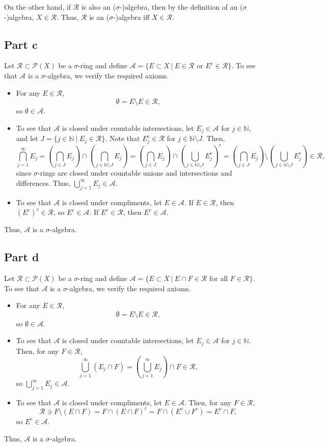\documentclass{article}
\begin{document}
On the other hand, if $\mathcal R$ is also an ($\sigma$-)algebra, then by the definition of an ($\sigma$-)algebra, $X\in\mathcal R$. Thus, $\mathcal{R}$ is an ($\sigma$-)algebra iff $X\in\mathcal R$.

\subsection{Part c}
Let $\mathcal R\subset\mathcal P(X)$ be a $\sigma$-ring and define $\mathcal A=\{E\subset X~|~E\in\mathcal R\text{ or }E^c\in\mathcal R\}$. To see that $\mathcal A$ is a $\sigma$-algebra, we verify the required axioms.
\begin{itemize}
	\item For any $E\in\mathcal R$, 
	\[
	\emptyset=E\setminus E\in\mathcal R,
	\]
	so $\emptyset\in\mathcal A$.
	\item To see that $\mathcal A$ is closed under countable intersections, let $E_j\in\mathcal{A}$ for $j\in\mathbb{N}$, and let $J=\{j\in\mathbb{N}~|~E_j\in\mathcal R\}$. Note that $E_j^c\in\mathcal R$ for $j\in \mathbb{N}\setminus J$. Then,
	\[
	\bigcap_{j=1}^\infty E_j=\left(\bigcap_{j\in J} E_j\right)\cap\left(\bigcap_{j\in \mathbb{N}\setminus J} E_j\right)=\left(\bigcap_{j\in J} E_j\right)\cap\left(\bigcup_{j\in \mathbb{N}\setminus J} E_j^c\right)^c=\left(\bigcap_{j\in J} E_j\right)\setminus\left(\bigcup_{j\in \mathbb{N}\setminus J} E_j^c\right)\in\mathcal R,
	\]
	since $\sigma$-rings are closed under countable unions and intersections and differences. Thus, $\bigcup_{j=1}^\infty E_j\in\mathcal A$.
	\item To see that $\mathcal A$ is closed under compliments, let $E\in\mathcal A$. If $E\in\mathcal R$, then $(E^c)^c\in\mathcal R$, so $E^c\in\mathcal A$. If $E^c\in\mathcal R$, then $E^c\in\mathcal A$.
\end{itemize}
Thus, $\mathcal A$ is a $\sigma$-algebra.
\subsection{Part d}
Let $\mathcal R\subset\mathcal P(X)$ be a $\sigma$-ring and define $\mathcal A=\{E\subset X~|~E\cap F\in\mathcal R\text{ for all }F\in\mathcal R\}$. To see that $\mathcal A$ is a $\sigma$-algebra, we verify the required axioms.
\begin{itemize}
	\item For any $E\in\mathcal R$, 
	\[
	\emptyset=E\setminus E\in\mathcal R,
	\]
	so $\emptyset\in\mathcal A$.
	\item To see that $\mathcal A$ is closed under countable intersections, let $E_j\in\mathcal{A}$ for $j\in\mathbb{N}$. Then, for any $F\in\mathcal R$,
	\[
	\bigcup_{j=1}^\infty(E_j\cap F)=\left(\bigcup_{j=1}^\infty E_j\right)\cap F\in\mathcal R,
	\]
	so $\bigcup_{j=1}^\infty E_j\in\mathcal A$.
	\item To see that $\mathcal A$ is closed under compliments, let $E\in\mathcal A$. Then, for any $F\in\mathcal R$,
	\[
	\mathcal R\ni F\setminus(E\cap F)=F\cap(E\cap F)^c=F\cap(E^c\cup F^c)=E^c\cap F,
	\]
	so $E^c\in\mathcal A$.
\end{itemize}
Thus, $\mathcal A$ is a $\sigma$-algebra.
\end{document}
